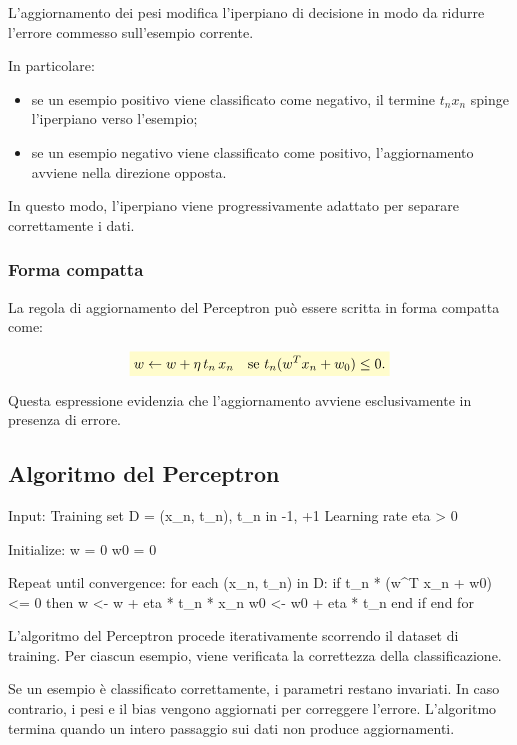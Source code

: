 \documentclass[a4paper,12pt]{report}
\newcommand{\highlight}[1]{%
\colorbox{yellow!20}{$\displaystyle #1$}%
}
\begin{document}
L’aggiornamento dei pesi modifica l’iperpiano di decisione in modo da ridurre l’errore commesso sull’esempio corrente.

In particolare:
\begin{itemize}
    \item se un esempio positivo viene classificato come negativo, il termine \( t_n x_n \) spinge l’iperpiano verso l’esempio;
    \item se un esempio negativo viene classificato come positivo, l’aggiornamento avviene nella direzione opposta.
\end{itemize}

In questo modo, l’iperpiano viene progressivamente adattato per separare correttamente i dati.

\subsubsection*{Forma compatta}

La regola di aggiornamento del Perceptron può essere scritta in forma compatta come:

\[
\highlight{
w \leftarrow w + \eta \, t_n \, x_n
\quad \text{se } t_n (w^T x_n + w_0) \leq 0.}
\]

Questa espressione evidenzia che l’aggiornamento avviene esclusivamente in presenza di errore.

\newpage
\subsection{Algoritmo del Perceptron}

\begin{pseudocode}
Input:
    Training set D = {(x_n, t_n)}, t_n in {-1, +1}
    Learning rate eta > 0

Initialize:
    w = 0
    w0 = 0

Repeat until convergence:
    for each (x_n, t_n) in D:
        if t_n * (w^T x_n + w0) <= 0 then
            w  <- w  + eta * t_n * x_n
            w0 <- w0 + eta * t_n
        end if
    end for
\end{pseudocode}

L’algoritmo del Perceptron procede iterativamente scorrendo il dataset di training. 
Per ciascun esempio, viene verificata la correttezza della classificazione.

Se un esempio è classificato correttamente, i parametri restano invariati.
In caso contrario, i pesi e il bias vengono aggiornati per correggere l’errore.
L’algoritmo termina quando un intero passaggio sui dati non produce aggiornamenti.
\end{document}
